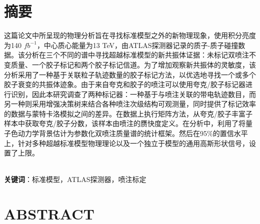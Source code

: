 \documentclass[UTF8,12pt]{ctexart}
\numberwithin{equation}{section}
\renewcommand{\rm}{\mathrm}
\begin{document}
		\newpage
		\pagestyle{fancy}
		\fancyhf{}
		\cfoot{$\bm{-\,\rm{\thepage}\,-}$}
		
		
		
		\section*{摘\quad 要}
		
\hspace{8mm}
这篇论文中所呈现的物理分析旨在寻找标准模型之外的新物理现象，使用积分亮度为140 $fb^{-1}$，中心质心能量为13 TeV，由ATLAS探测器记录的质子-质子碰撞数据。该分析在三个不同的谱中寻找超越标准模型的新共振体证据：未标记双喷注不变质量、一个胶子标记和两个胶子标记信道。为了增加观察新共振体的灵敏度，该分析采用了一种基于关联粒子轨迹数量的胶子标记方法，以优选地寻找一个或多个胶子衰变的共振体迹象。由于来自夸克和胶子的喷注可以使用夸克/胶子标记器进行识别，因此本研究调查了两种标记器：一种基于与喷注关联的带电轨迹数目，而另一种则采用增强决策树来结合各种喷注次级结构可观测量，同时提供了标记效率的数据与蒙特卡洛模拟之间的差异。在数据上执行矩阵方法，从夸克/胶子丰富子样本中获取夸克/胶子分数，该样本由喷注的赝快度定义。在分析中，利用了将量子色动力学背景估计为参数化双喷注质量谱的统计框架。然后在95\%的置信水平上，针对多种超越标准模型物理理论以及一个独立于模型的通用高斯形状信号，设置了上限。		
		
		
~\\
\textbf{关键词}：标准模型，ATLAS探测器，喷注标定

		
		
		


\newpage


\section*{\textbf{ABSTRACT}}

\hspace{8mm}
\end{document}
